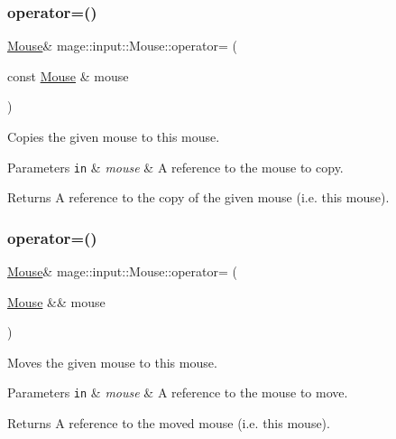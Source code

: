 \subsubsection{\texorpdfstring{operator=()}{operator=()}\hspace{0.1cm}{\footnotesize\ttfamily [1/2]}}
{\footnotesize\ttfamily \hyperlink{classmage_1_1input_1_1_mouse}{Mouse}\& mage\+::input\+::\+Mouse\+::operator= (\begin{DoxyParamCaption}\item[{const \hyperlink{classmage_1_1input_1_1_mouse}{Mouse} \&}]{mouse }\end{DoxyParamCaption})\hspace{0.3cm}{\ttfamily [delete]}}

Copies the given mouse to this mouse.


\begin{DoxyParams}[1]{Parameters}
\mbox{\tt in}  & {\em mouse} & A reference to the mouse to copy. \\
\hline
\end{DoxyParams}
\begin{DoxyReturn}{Returns}
A reference to the copy of the given mouse (i.\+e. this mouse). 
\end{DoxyReturn}
\hypertarget{classmage_1_1input_1_1_mouse_a05d2471a4f517cc1970df352e7a68724}{}\label{classmage_1_1input_1_1_mouse_a05d2471a4f517cc1970df352e7a68724} 
\subsubsection{\texorpdfstring{operator=()}{operator=()}\hspace{0.1cm}{\footnotesize\ttfamily [2/2]}}
{\footnotesize\ttfamily \hyperlink{classmage_1_1input_1_1_mouse}{Mouse}\& mage\+::input\+::\+Mouse\+::operator= (\begin{DoxyParamCaption}\item[{\hyperlink{classmage_1_1input_1_1_mouse}{Mouse} \&\&}]{mouse }\end{DoxyParamCaption})\hspace{0.3cm}{\ttfamily [delete]}}

Moves the given mouse to this mouse.


\begin{DoxyParams}[1]{Parameters}
\mbox{\tt in}  & {\em mouse} & A reference to the mouse to move. \\
\hline
\end{DoxyParams}
\begin{DoxyReturn}{Returns}
A reference to the moved mouse (i.\+e. this mouse). 
\end{DoxyReturn}
\hypertarget{classmage_1_1input_1_1_mouse_aa4eb9865206c2b946f8d21106d378907}{}\label{classmage_1_1input_1_1_mouse_aa4eb9865206c2b946f8d21106d378907} 
